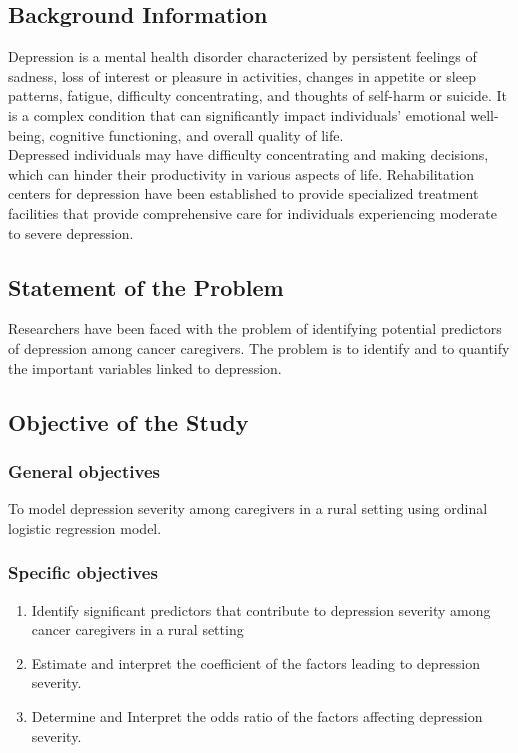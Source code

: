 \documentclass[12pt]{article}\usepackage[]{graphicx}\usepackage[]{xcolor}
\numberwithin{equation}{section}
\numberwithin{figure}{section}
\begin{document}
\subsection{Background Information}

Depression is a mental health disorder characterized by persistent feelings of sadness, loss of interest or pleasure in activities, changes in appetite or sleep patterns, fatigue, difficulty concentrating, and thoughts of self-harm or suicide. It is a complex condition that can significantly impact individuals' emotional well-being, cognitive functioning, and overall quality of life.\\ Depressed individuals may have difficulty concentrating and making decisions, which can hinder their productivity in various aspects of life. Rehabilitation centers for depression have been established to  provide specialized treatment facilities that provide comprehensive care for individuals experiencing moderate to severe depression.
\subsection{Statement of the Problem}
Researchers have been faced with the problem of identifying potential predictors of depression among cancer caregivers. The problem is to identify and to quantify the important variables linked to depression.
\subsection{Objective of the Study}
\subsubsection{General objectives}
To model depression severity among caregivers in a rural setting using ordinal logistic regression model.
\subsubsection{Specific objectives}
\begin{enumerate}
\item Identify significant predictors that contribute to depression severity among cancer caregivers in a rural setting
\item Estimate and interpret the coefficient of the factors leading to depression severity.
\item Determine and Interpret the odds ratio of the factors affecting depression severity.
\end{enumerate}
\end{document}
